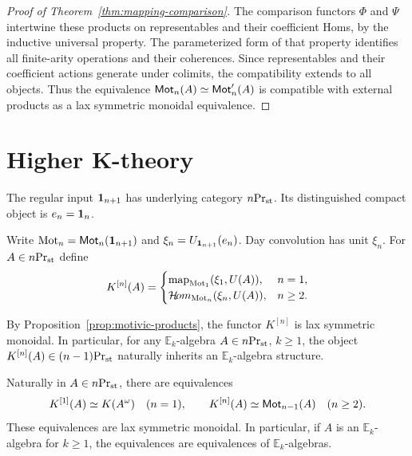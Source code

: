 \begin{proof}[{Proof of Theorem~\ref{thm:mapping-comparison}}]
The comparison functors $\Phi$ and $\Psi$ intertwine
these products on representables and their coefficient
Homs, by the inductive universal property.
The parameterized form of that property identifies
all finite-arity operations and their coherences.
Since representables and their coefficient actions
generate under colimits, the compatibility extends
to all objects. Thus the equivalence
$\mathsf{Mot}_n(A)\simeq\mathsf{Mot}'_n(A)$ is compatible with
external products as a lax symmetric monoidal
equivalence.

\end{proof}



\section{Higher K-theory}\label{sec:higher-k}


The regular input $\mathbf 1_{n+1}$ has underlying category ${n}\mathrm{Pr}_{\mathrm{st}}$.
Its distinguished compact object is $e_n=\mathbf 1_n$.

\begin{definition}\label{def:unit-corepresented-K}
Write
$\operatorname{Mot}_n=\mathsf{Mot}_n(\mathbf 1_{n+1})$ and
$\xi_n=U_{\mathbf 1_{n+1}}(e_n)$.
Day convolution has unit $\xi_n$.
For $A\in{n}\mathrm{Pr}_{\mathrm{st}}$ define
\begin{equation}
 K^{[n]}(A)=
 \begin{cases}
  \operatorname{map}_{\operatorname{Mot}_1}(\xi_1,U(A)),&n=1,\\
  \mathcal{H}\!om_{\operatorname{Mot}_n}(\xi_n,U(A)),&n\geq2.
 \end{cases}
 \label{eq:unit-corepresented-K}
\end{equation}
\end{definition}


By Proposition~\ref{prop:motivic-products},
the functor $K^{[n]}$ is lax symmetric monoidal.
In particular, for any $\mathbb E_k$-algebra
$A\in{n}\mathrm{Pr}_{\mathrm{st}}$, $k\geq1$, the object
$K^{[n]}(A)\in{(n-1)}\mathrm{Pr}_{\mathrm{st}}$ naturally inherits
an $\mathbb E_k$-algebra structure.


\begin{corollary}\label{cor:K-normalization}
Naturally in $A\in{n}\mathrm{Pr}_{\mathrm{st}}$, there are equivalences
\begin{equation}\label{eq:K-normalization}
 K^{[1]}(A)\simeq K(A^\omega)\quad(n=1),
 \qquad
 K^{[n]}(A)\simeq\mathsf{Mot}_{n-1}(A)\quad(n\geq2).
\end{equation}
These equivalences are lax symmetric monoidal.
In particular, if $A$ is an $\mathbb E_k$-algebra
for $k\geq1$, the equivalences are equivalences of
$\mathbb E_k$-algebras.
\end{corollary}

